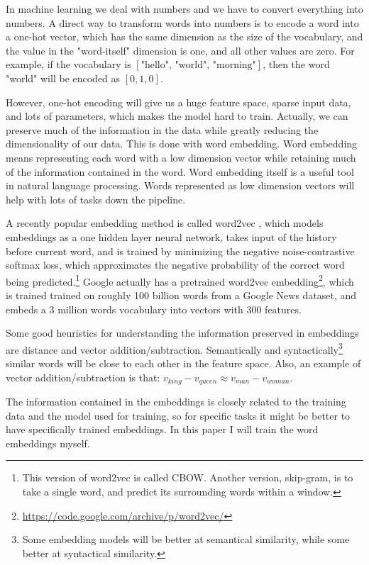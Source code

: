 \documentclass[a4paper]{article}
\begin{document}
In machine learning we deal with numbers and we have to convert everything into numbers. A direct way to transform words into numbers is to encode a word into a one-hot vector, which has the same dimension as the size of the vocabulary, and the value in the "word-itself" dimension is one, and all other values are zero. For example, if the vocabulary is $[ \text{"hello", "world", "morning"} ]$, then the word "world" will be encoded as $[0, 1, 0]$.

However, one-hot encoding will give us a huge feature space, sparse input data, and lots of parameters, which makes the model hard to train. Actually, we can preserve much of the information in the data while greatly reducing the dimensionality of our data. This is done with word embedding. Word embedding means representing each word with a low dimension vector while retaining much of the information contained in the word. Word embedding itself is a useful tool in natural language processing. Words represented as low dimension vectors will help with lots of tasks down the pipeline. 

A recently popular embedding method is called word2vec \citep{mikolov2013efficient}, which models embeddings as a one hidden layer neural network, takes input of the history before current word, and is trained by minimizing the negative noise-contrastive softmax loss, which approximates the negative probability of the correct word being predicted.\footnote{This version of word2vec is called CBOW. Another version, skip-gram, is to take a single word, and predict its surrounding words within a window.} Google actually has a pretrained word2vec embedding\footnote{\url{https://code.google.com/archive/p/word2vec/}}, which is trained trained on roughly 100 billion words from a Google News dataset, and embeds a 3 million words vocabulary into vectors with 300 features. 

Some good heuristics for understanding the information preserved in embeddings are distance and vector addition/subtraction. Semantically and syntactically\footnote{Some embedding models will be better at semantical similarity, while some better at syntactical similarity.} similar words will be close to each other in the feature space. Also, an example of vector addition/subtraction is that: $v_{king} - v_{queen} \approx v_{man} - v_{woman}$.

The information contained in the embeddings is closely related to the training data and the model used for training, so for specific tasks it might be better to have specifically trained embeddings. In this paper I will train the word embeddings myself. 
\end{document}
